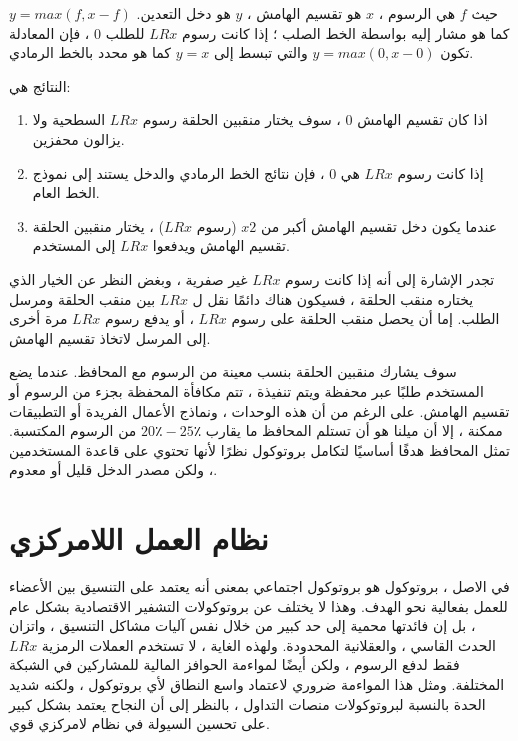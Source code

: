 \documentclass[12pt, a4paper, leqno]{report}
\theoremstyle{plain}
\theoremstyle{definition}
\begin{document}
\begin{multicols}{2}
\begin{otherlanguage}{arabic}
حيث $f$ هي الرسوم  ، $x$ هو تقسيم الهامش ، $y$ هو دخل التعدين. $y = max(f, x - f)$ كما هو مشار إليه بواسطة الخط الصلب ؛ إذا كانت رسوم $LRx$ للطلب 0 ، فإن المعادلة تكون $y = max(0, x - 0)$  والتي تبسط إلى $y = x$ كما هو محدد بالخط الرمادي.

النتائج هي:
\begin{enumerate}
	\item اذا كان تقسيم الهامش  0 ، سوف يختار منقبين الحلقة رسوم $LRx$ السطحية ولا يزالون محفزين.
	\item إذا كانت رسوم $LRx$ هي 0 ، فإن نتائج الخط الرمادي والدخل يستند إلى نموذج الخط العام.
	\item عندما يكون دخل تقسيم الهامش أكبر من $x2$ (رسوم $LRx$) ، يختار منقبين الحلقة تقسيم الهامش ويدفعوا $LRx$ إلى المستخدم.
\end{enumerate}

تجدر الإشارة إلى أنه إذا كانت رسوم $LRx$ غير صفرية ، وبغض النظر عن الخيار الذي يختاره منقب الحلقة ، فسيكون هناك دائمًا نقل ل $LRx$ بين منقب الحلقة ومرسل الطلب. إما أن يحصل منقب الحلقة على رسوم $LRx$ ، أو يدفع رسوم $LRx$ مرة أخرى إلى المرسل لاتخاذ تقسيم الهامش.

سوف يشارك منقبين الحلقة بنسب معينة من الرسوم مع المحافظ. عندما يضع المستخدم طلبًا عبر محفظة ويتم تنفيذة ، تتم مكافأة المحفظة بجزء من الرسوم أو تقسيم الهامش. على الرغم من أن هذه الوحدات ، ونماذج الأعمال الفريدة أو التطبيقات ممكنة ، إلا أن ميلنا هو أن تستلم المحافظ ما يقارب $20٪ -25٪$ من الرسوم المكتسبة. تمثل المحافظ هدفًا أساسيًا لتكامل بروتوكول  نظرًا لأنها تحتوي على قاعدة المستخدمين ، ولكن مصدر الدخل قليل أو معدوم.
\end{otherlanguage}
\section{نظام العمل اللامركزي}
\begin{otherlanguage}{arabic}
في الاصل ، بروتوكول   هو بروتوكول اجتماعي بمعنى أنه يعتمد على التنسيق بين الأعضاء للعمل بفعالية نحو الهدف. وهذا لا يختلف عن بروتوكولات التشفير الاقتصادية بشكل عام ، بل إن فائدتها محمية إلى حد كبير من خلال نفس آليات مشاكل التنسيق  ، واتزان الحدث القاسي ، والعقلانية المحدودة. ولهذه الغاية ، لا تستخدم العملات الرمزية $LRx$ فقط لدفع الرسوم ، ولكن أيضًا لمواءمة الحوافز المالية للمشاركين في الشبكة المختلفة. ومثل هذا المواءمة ضروري لاعتماد واسع النطاق لأي بروتوكول ، ولكنه شديد الحدة بالنسبة لبروتوكولات منصات التداول  ، بالنظر إلى أن النجاح يعتمد بشكل كبير على تحسين السيولة في نظام لامركزي قوي.


\end{otherlanguage}
\end{multicols}
\end{document}
